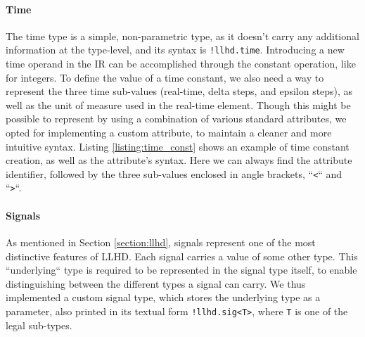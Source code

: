 
\paragraph{Time}
The time type is a simple, non-parametric type, as it doesn’t carry any additional information at the type-level, and its syntax is \texttt{!llhd.time}.
Introducing a new time operand in the IR can be accomplished through the constant operation, like for integers. To define the value of a time constant, we also need a way to represent the three time sub-values (real-time, delta steps, and epsilon steps), as well as the unit of measure used in the real-time element. Though this might be possible to represent by using a combination of various standard attributes, we opted for implementing a custom attribute, to maintain a cleaner and more intuitive syntax. Listing \ref{listing:time_const} shows an example of time constant creation, as well as the attribute's syntax. Here we can always find the attribute identifier, followed by the three sub-values enclosed in angle brackets, “\texttt{<}“ and “\texttt{>}“.


\paragraph{Signals}
As mentioned in Section \ref{section:llhd}, signals represent one of the most distinctive features of LLHD. Each signal carries a value of some other type. This “underlying“ type is required to be represented in the signal type itself, to enable distinguishing between the different types a signal can carry. We thus implemented a custom signal type, which stores the underlying type as a parameter, also printed in its textual form \texttt{!llhd.sig<T>}, where \texttt{T} is one of the legal sub-types.

